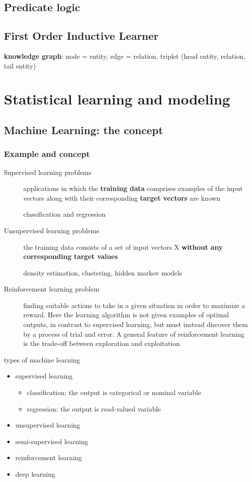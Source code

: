 \documentclass[11pt]{article}
\begin{document}
\subsection{Predicate logic}
\label{sec:orgef07aea}
\subsection{First Order Inductive Learner}
\label{sec:org51697f6}
\textbf{knowledge graph}: node = entity, edge = relation.
triplet (head entity, relation, tail entity)
\section{Statistical learning and modeling}
\label{sec:orgdb90b83}
\subsection{Machine Learning: the concept}
\label{sec:org4ed7e72}
\subsubsection{Example and concept}
\label{sec:orga4d2f37}
\begin{description}
\item[{Supervised learning problems}] applications in which the \textbf{training data} comprises examples of the input
vectors along with their corresponding \textbf{target vectors} are known

classification and regression
\item[{Unsupervised learning problems}] the training data consists of a set of input vectors X \textbf{without any
corresponding target values}

density estimation, clustering, hidden markov models
\item[{Reinforcement learning problem}] finding suitable actions to take in a given situation in order to
maximize a reward. Here the learning algorithm is not given examples of
optimal outputs, in contrast to supervised learning, but must instead
discover them by a process of trial and error. A general feature of
reinforcement learning is the trade-off between exploration and exploitation
\end{description}

types of machine learning
\begin{itemize}
\item supervised learning
\begin{itemize}
\item classification: the output is categorical or nominal variable
\item regression: the output is read-valued variable
\end{itemize}
\item unsupervised learning
\item semi-supervised learning
\item reinforcement learning
\item deep learning
\end{itemize}
\end{document}
